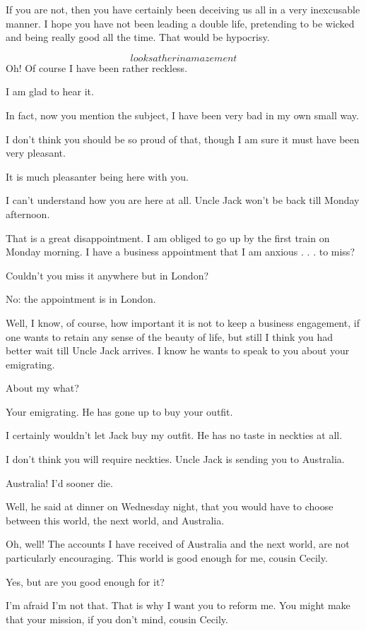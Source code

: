 \documentclass{book}
\begin{document}
\5  If you are not, then you have certainly been deceiving us
all in a very inexcusable manner.  I hope you have not been leading
a double life, pretending to be wicked and being really good all
the time.  That would be hypocrisy.

\2  \[looks at her in amazement\]  Oh!  Of course I have been
rather reckless.

\5  I am glad to hear it.

\2  In fact, now you mention the subject, I have been very
bad in my own small way.

\5  I don't think you should be so proud of that, though I am
sure it must have been very pleasant.

\2  It is much pleasanter being here with you.

\5  I can't understand how you are here at all.  Uncle Jack
won't be back till Monday afternoon.

\2  That is a great disappointment.  I am obliged to go up
by the first train on Monday morning.  I have a business
appointment that I am anxious . . . to miss?

\5  Couldn't you miss it anywhere but in London?

\2  No: the appointment is in London.

\5  Well, I know, of course, how important it is not to keep a
business engagement, if one wants to retain any sense of the beauty
of life, but still I think you had better wait till Uncle Jack
arrives.  I know he wants to speak to you about your emigrating.

\2  About my what?

\5  Your emigrating.  He has gone up to buy your outfit.

\2  I certainly wouldn't let Jack buy my outfit.  He has no
taste in neckties at all.

\5  I don't think you will require neckties.  Uncle Jack is
sending you to Australia.

\2  Australia!  I'd sooner die.

\5  Well, he said at dinner on Wednesday night, that you would
have to choose between this world, the next world, and Australia.

\2  Oh, well!  The accounts I have received of Australia and
the next world, are not particularly encouraging.  This world is
good enough for me, cousin Cecily.

\5  Yes, but are you good enough for it?

\2  I'm afraid I'm not that.  That is why I want you to
reform me.  You might make that your mission, if you don't mind,
cousin Cecily.
\end{document}
